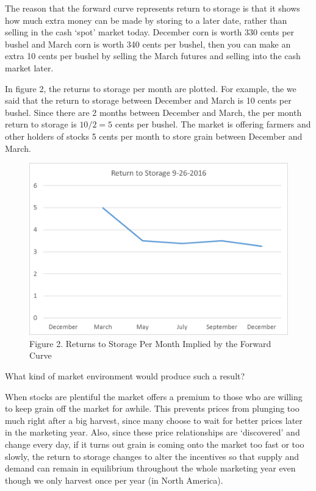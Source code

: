 \documentclass[]{book}
\theoremstyle{definition}
\theoremstyle{definition}
\theoremstyle{remark}
\begin{document}
The reason that the forward curve represents return to storage is that
it shows how much extra money can be made by storing to a later date,
rather than selling in the cash `spot' market today. December corn is
worth 330 cents per bushel and March corn is worth 340 cents per bushel,
then you can make an extra 10 cents per bushel by selling the March
futures and selling into the cash market later.

In figure 2, the returns to storage per month are plotted. For example,
the we said that the return to storage between December and March is 10
cents per bushel. Since there are 2 months between December and March,
the per month return to storage is \(10/2 = 5\) cents per bushel. The
market is offering farmers and other holders of stocks 5 cents per month
to store grain between December and March.

\begin{figure}[htbp]
\centering
\includegraphics{Excel-files/PricesSpaceTime/forward-curves_files/image003.png}
\caption{Figure 2. Returns to Storage Per Month Implied by the Forward
Curve}
\end{figure}

What kind of market environment would produce such a result?

When stocks are plentiful the market offers a premium to those who are
willing to keep grain off the market for awhile. This prevents prices
from plunging too much right after a big harvest, since many choose to
wait for better prices later in the marketing year. Also, since these
price relationships are `discovered' and change every day, if it turns
out grain is coming onto the market too fast or too slowly, the return
to storage changes to alter the incentives so that supply and demand can
remain in equilibrium throughout the whole marketing year even though we
only harvest once per year (in North America).
\end{document}
